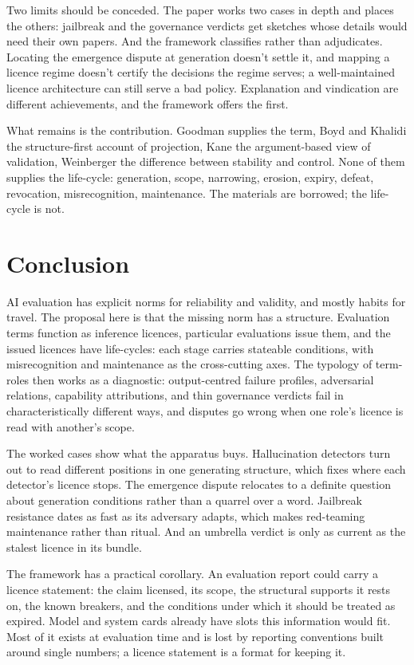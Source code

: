 \documentclass[12pt]{article}
\begin{document}
Two limits should be conceded. The paper works two cases in depth and places
the others: jailbreak and the governance verdicts get sketches whose details
would need their own papers. And the framework classifies rather than
adjudicates. Locating the emergence dispute at generation doesn't settle it,
and mapping a licence regime doesn't certify the decisions the regime serves; a
well-maintained licence architecture can still serve a bad policy. Explanation
and vindication are different achievements, and the framework offers the first.

What remains is the contribution. Goodman supplies the term, Boyd and Khalidi
the structure-first account of projection, Kane the argument-based view of
validation, Weinberger the difference between stability and control. None of
them supplies the life-cycle: generation, scope, narrowing, erosion, expiry,
defeat, revocation, misrecognition, maintenance. The materials are borrowed;
the life-cycle is not.

\section{Conclusion}\label{sec:conclusion}

AI evaluation has explicit norms for reliability and validity, and mostly
habits for travel. The proposal here is that the missing norm has a structure.
Evaluation terms function as inference licences, particular evaluations issue
them, and the issued licences have life-cycles: each stage carries stateable
conditions, with misrecognition and maintenance as the cross-cutting axes. The
typology of term-roles then works as a diagnostic: output-centred failure
profiles, adversarial relations, capability attributions, and thin governance
verdicts fail in characteristically different ways, and disputes go wrong when
one role's licence is read with another's scope.

The worked cases show what the apparatus buys. Hallucination detectors turn
out to read different positions in one generating structure, which fixes where
each detector's licence stops. The emergence dispute relocates to a definite
question about generation conditions rather than a quarrel over a word.
Jailbreak resistance dates as fast as its adversary adapts, which makes
red-teaming maintenance rather than ritual. And an umbrella verdict is only as
current as the stalest licence in its bundle.

The framework has a practical corollary. An evaluation report could carry a
licence statement: the claim licensed, its scope, the structural supports it
rests on, the known breakers, and the conditions under which it should be
treated as expired. Model and system cards already have slots this information
would fit. Most of it exists at evaluation time and is lost by reporting
conventions built around single numbers; a licence statement is a format for
keeping it.
\end{document}
